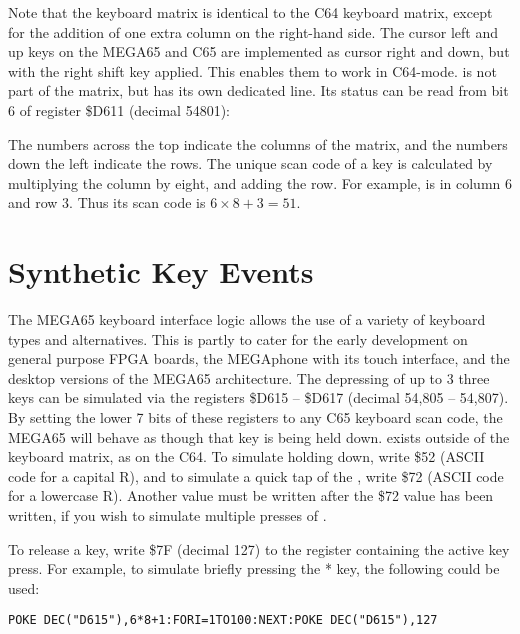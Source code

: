 Note that the keyboard matrix is identical to the C64 keyboard matrix, except for the addition of one extra column
on the right-hand side.  The cursor left and up keys on the MEGA65 and C65 are implemented as cursor right and down, but
with the right shift key applied.  This enables them to work in C64-mode.   is not
part of the matrix, but has its own dedicated line.  Its status can be read from bit 6 of register \$D611 (decimal 54801):

The numbers across the top indicate the columns of the matrix, and the numbers down the left indicate the rows.
The unique scan code of a key is calculated by multiplying the column by eight, and adding the row.  For example,
 is in column 6 and row 3. Thus its scan code is $6 \times 8 + 3 = 51$.

\section{Synthetic Key Events}

The MEGA65 keyboard interface logic allows the use of a variety of keyboard types and alternatives. This is partly
to cater for the early development on general purpose FPGA boards, the MEGAphone with its touch interface, and the
desktop versions of the MEGA65 architecture.  The depressing of up to 3 three keys can be simulated via
the registers \$D615 -- \$D617 (decimal 54,805 -- 54,807).  By setting the
lower 7 bits of these registers to any C65 keyboard scan code, the MEGA65 will behave as though that key is being
held down.  exists outside of the keyboard matrix, as on the C64.  To simulate
holding  down, write \$52 (ASCII code for a capital R), and to simulate a quick tap
of the , write \$72 (ASCII code for a lowercase R).  Another value must be written after the
\$72 value has been written, if you wish to simulate multiple presses of .

To release a key, write \$7F (decimal 127) to the register containing the active key press. For example,
to simulate briefly pressing the * key, the following could be used:

\begin{tcolorbox}[colback=black,coltext=white]
\verbatimfont{\codefont}
\begin{verbatim}
POKE DEC("D615"),6*8+1:FORI=1TO100:NEXT:POKE DEC("D615"),127
\end{verbatim}
\end{tcolorbox}

